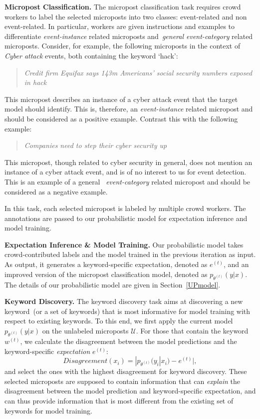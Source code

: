 \documentclass[letterpaper]{article}
\begin{document}
\smallskip
\noindent\textbf{Micropost Classification.} The micropost classification task requires crowd workers to label the selected microposts into two classes: event-related and non event-related. In particular, workers are given instructions and examples to differentiate \emph{event-instance} related microposts and~\emph{general event-category} related microposts. Consider, for example, the following microposts in the context of \emph{Cyber attack} events, both containing the keyword \lq hack':
\begin{quote}
    \emph{Credit firm Equifax says 143m Americans' social security numbers exposed in hack}
\end{quote}
     This micropost describes an instance of a cyber attack event that the target model should identify. This is, therefore, an \emph{event-instance} related micropost and should be considered as a positive example. Contrast this with the following example:

\begin{quote}
    \emph{Companies need to step their cyber security up}
\end{quote}
This micropost, though related to cyber security in general, does not mention an instance of a cyber attack event, and is of no interest to us for event detection. This is an example of a general ~\emph{event-category} related micropost and should be considered as a negative example.

In this task, each selected micropost is labeled by multiple crowd workers. The annotations are passed to our probabilistic model for expectation inference and model training.

\smallskip
\noindent\textbf{Expectation Inference \& Model Training.} Our probabilistic model takes crowd-contributed labels and the model trained in the previous iteration as input. As output, it generates a keyword-specific expectation, denoted as $e^{(t)}$, and an improved version of the micropost classification model, denoted as $p_{\theta^{(t)}}(y|x)$. The details of our probabilistic model are given in Section~\ref{UPmodel}.

\smallskip
\noindent\textbf{Keyword Discovery.} The keyword discovery task aims at discovering a new keyword~(or a set of keywords) that is most informative for model training with respect to existing keywords. To this end, we first apply the current model $p_{\theta^{(t)}}(y|x)$ on the unlabeled microposts $\mathcal{U}$. For those that contain the keyword $w^{(t)}$, we calculate the disagreement between the model predictions and the keyword-specific \emph{expectation} $e^{(t)}$:
\begin{equation}
    Disagreement(x_i) = |p_{\theta^{(t)}}(y_i|x_i) - e^{(t)}|,
    \label{equ:disagree}
\end{equation}
and select the ones with the highest disagreement for keyword discovery. These selected microposts are supposed to contain information that can \emph{explain} the disagreement between the model prediction and keyword-specific expectation, and can thus provide information that is most different from the existing set of keywords for model training.
\end{document}
